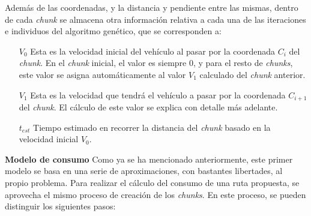 \documentclass[11pt,spanish,listoffigures,listoftables]{tfgetsinf}
\begin{document}
Además de las coordenadas, y la distancia y pendiente entre las mismas, dentro de cada \textit{chunk} se almacena otra información relativa a cada una de las iteraciones e individuos del algoritmo genético, que se corresponden a:
\begin{itemize}
    \item[$V_{0}$] Esta es la velocidad inicial del vehículo al pasar por la coordenada $C_{i}$ del \textit{chunk}. En el \textit{chunk} inicial, el valor es siempre 0, y para el resto de \textit{chunks}, este valor se asigna automáticamente al valor $V_{1}$ calculado del \textit{chunk} anterior.
    \item[$V_{1}$] Esta es la velocidad que tendrá el vehículo a pasar por la coordenada $C_{i+1}$ del \textit{chunk}. El cálculo de este valor se explica con detalle más adelante.
    \item[$t_{est}$] Tiempo estimado en recorrer la distancia del \textit{chunk} basado en la velocidad inicial $V_{0}$.
\end{itemize}{}

\textbf{Modelo de consumo}\newline
Como ya se ha mencionado anteriormente, este primer modelo se basa en una serie de aproximaciones, con bastantes libertades, al propio problema. Para realizar el cálculo del consumo de una ruta propuesta, se aprovecha el mismo proceso de creación de los \textit{chunks}. En este proceso, se pueden distinguir los siguientes pasos:
\end{document}
